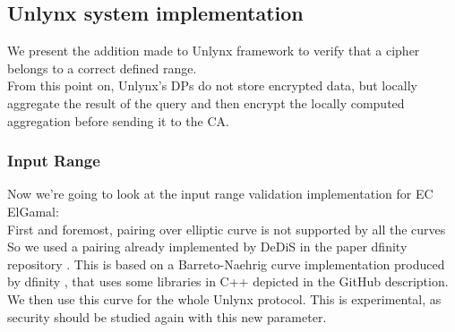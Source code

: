 \documentclass{article}
\begin{document}
\subsection{Unlynx system implementation}
We present the addition made to Unlynx framework to verify that a cipher belongs to a correct defined range.\\
From this point on, Unlynx's DPs do not store encrypted data, but locally aggregate the result of the query and then encrypt the locally computed aggregation before sending it to the CA.

\subsubsection*{Input Range}
Now we're going to look at the input range validation implementation for EC ElGamal:\\

First and foremost, pairing over elliptic curve is not supported by all the curves So we used a pairing already implemented by DeDiS in the paper dfinity repository \cite{dfinitydedis}.  This is based on a Barreto-Naehrig curve implementation produced by dfinity \cite{dfinity}, that uses some libraries in C++ depicted in the GitHub description. We then use this curve for the whole Unlynx protocol. This is experimental, as security should be studied again with this new parameter.\\
\end{document}
